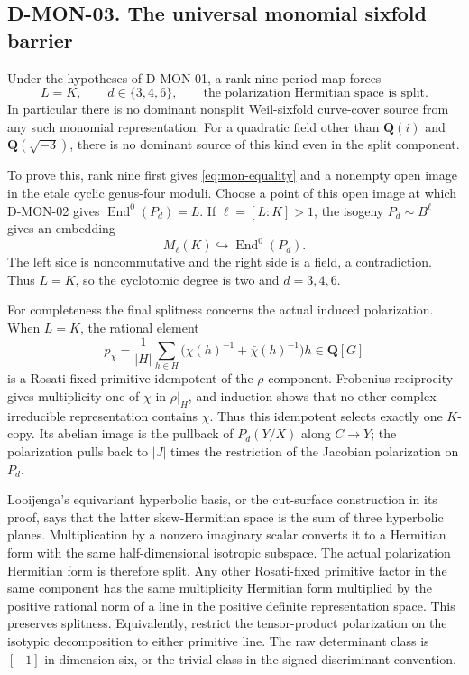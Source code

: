 \subsection*{D-MON-03. The universal monomial sixfold barrier}

Under the hypotheses of D-MON-01, a rank-nine period map forces
\begin{equation}\label{eq:mon-final}
                 L=K,\qquad d\in\{3,4,6\},
                 \qquad\text{the polarization Hermitian space is split.}
\end{equation}
In particular there is no dominant nonsplit Weil-sixfold curve-cover
source from any such monomial representation. For a quadratic field
other than $\mathbf Q(i)$ and $\mathbf Q(\sqrt{-3})$, there is no
dominant source of this kind even in the split component.

To prove this, rank nine first gives \eqref{eq:mon-equality} and a
nonempty open image in the etale cyclic genus-four moduli. Choose a
point of this open image at which D-MON-02 gives
$\operatorname{End}^0(P_d)=L$. If $\ell=[L:K]>1$, the isogeny
$P_d\sim B^\ell$ gives an embedding
\[
                       M_\ell(K)\hookrightarrow\operatorname{End}^0(P_d).
\]
The left side is noncommutative and the right side is a field, a
contradiction. Thus $L=K$, so the cyclotomic degree is two and
$d=3,4,6$.

For completeness the final splitness concerns the actual induced
polarization. When $L=K$, the rational element
\[
 p_\chi=\frac1{|H|}\sum_{h\in H}
                   \bigl(\chi(h)^{-1}+\bar\chi(h)^{-1}\bigr)h
                   \in\mathbf Q[G]
\]
is a Rosati-fixed primitive idempotent of the $\rho$ component.
Frobenius reciprocity gives multiplicity one of $\chi$ in
$\rho|_H$, and induction shows that no other complex irreducible
representation contains $\chi$. Thus this idempotent selects exactly
one $K$-copy. Its abelian image is the pullback of $P_d(Y/X)$ along
$C\to Y$; the polarization pulls back to $|J|$ times the restriction
of the Jacobian polarization on $P_d$.

Looijenga's equivariant hyperbolic basis, or the cut-surface construction
in its proof, says that the latter skew-Hermitian space is the sum of
three hyperbolic planes. Multiplication by a nonzero imaginary scalar
converts it to a Hermitian form with the same half-dimensional isotropic
subspace. The actual polarization Hermitian form is therefore split.
Any other Rosati-fixed primitive factor in the same component has the
same multiplicity Hermitian form multiplied by the positive rational
norm of a line in the positive definite representation space. This
preserves splitness. Equivalently, restrict the tensor-product
polarization on the isotypic decomposition to either primitive line.
The raw determinant class is $[-1]$ in dimension six, or the trivial
class in the signed-discriminant convention.


